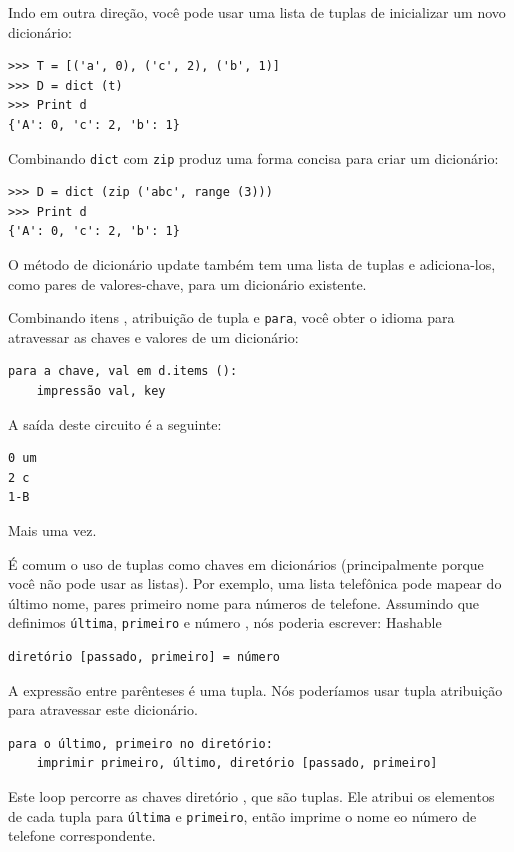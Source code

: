\documentclass[10pt]{book}
\begin{document}
\begin{exercise}
\begin{v erbatim}
{Indo em outra direção, você pode usar uma lista de tuplas de
inicializar um novo dicionário: 

\begin{verbatim}
>>> T = [('a', 0), ('c', 2), ('b', 1)]
>>> D = dict (t)
>>> Print d
{'A': 0, 'c': 2, 'b': 1}
\end{verbatim}

Combinando {\tt dict} com {\tt zip} produz uma forma concisa
para criar um dicionário:

\begin{verbatim}
>>> D = dict (zip ('abc', range (3)))
>>> Print d
{'A': 0, 'c': 2, 'b': 1}
\end{verbatim}
%
O método de dicionário {update \tt} também tem uma lista de tuplas
e adiciona-los, como pares de valores-chave, para um dicionário existente.

Combinando itens {\tt}, atribuição de tupla e {\tt para}, você
obter o idioma para atravessar as chaves e valores de um dicionário:

\begin{verbatim}
para a chave, val em d.items ():
    impressão val, key
\end{verbatim}
%
A saída deste circuito é a seguinte:

\begin{verbatim}
0 um
2 c
1-B
\end{verbatim}
%
Mais uma vez.

É comum o uso de tuplas como chaves em dicionários (principalmente porque
você não pode usar as listas). Por exemplo, uma lista telefônica pode mapear
do último nome, pares primeiro nome para números de telefone. Assumindo
que definimos {\tt última}, {\tt primeiro} e {número \tt}, nós
poderia escrever:
\index{} Hashable

\begin{verbatim}
diretório [passado, primeiro] = número
\end{verbatim}
%
A expressão entre parênteses é uma tupla. Nós poderíamos usar tupla
atribuição para atravessar este dicionário.

\begin{verbatim}
para o último, primeiro no diretório:
    imprimir primeiro, último, diretório [passado, primeiro]
\end{verbatim}
%
Este loop percorre as chaves {diretório \tt}, que são tuplas. Ele
atribui os elementos de cada tupla para {\tt última} e {\tt primeiro}, então
imprime o nome eo número de telefone correspondente.

}
\end{v erbatim}
\end{exercise}
\end{document}
